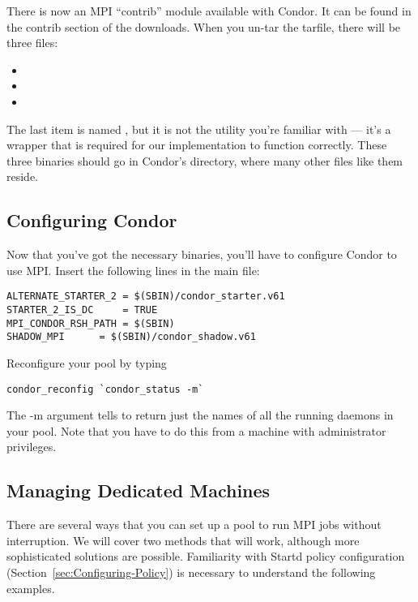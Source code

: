 There is now an MPI ``contrib'' module available with Condor.  It can
be found in the contrib section of the downloads.  When you un-tar the 
tarfile, there will be three files:

\begin{itemize}
\item{}
\item{}
\item{}
\end{itemize}

The last item is named , but it is not the  utility you're 
familiar with --- it's a wrapper that is required for our implementation to 
function correctly. 
These three binaries should go in Condor's  directory, where
many other files like them reside.

\subsection{\label{sec:MPI-config}Configuring Condor }

Now that you've got the necessary binaries, you'll have to configure Condor
to use MPI.  Insert the following lines in the main  file:
\begin{verbatim}
ALTERNATE_STARTER_2	= $(SBIN)/condor_starter.v61
STARTER_2_IS_DC		= TRUE
MPI_CONDOR_RSH_PATH	= $(SBIN)
SHADOW_MPI		= $(SBIN)/condor_shadow.v61
\end{verbatim}
Reconfigure your pool by typing
\begin{verbatim}
condor_reconfig `condor_status -m`
\end{verbatim}
The -m argument tells  to return just the names of all
the running  daemons in your pool.  Note that you have to do 
this from a machine with administrator privileges.

\subsection{\label{sec:MPI-machines}Managing Dedicated Machines}

There are several ways that you can set up a pool to run MPI jobs without 
interruption.  We will cover two methods that will work, although more
sophisticated solutions are possible. 
Familiarity with Startd policy configuration
(Section~\ref{sec:Configuring-Policy}) is necessary to understand the
following examples.

